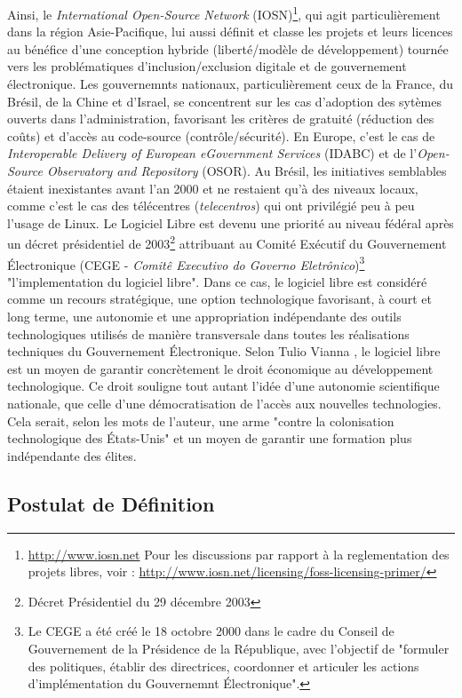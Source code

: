 Ainsi, le \emph{International Open-Source Network} (IOSN)\footnote{\url{http://www.iosn.net} Pour les discussions par rapport à la reglementation des projets libres, voir : \url{http://www.iosn.net/licensing/foss-licensing-primer/}}, qui agit particulièrement dans la région Asie-Pacifique, lui aussi définit et classe les projets et leurs licences au bénéfice d'une conception hybride (liberté/modèle de développement) tournée vers les problématiques d'inclusion/exclusion digitale et de gouvernement électronique. Les gouvernemnts nationaux, particulièrement ceux de la France, du Brésil, de la Chine et d'Israel, se concentrent sur les cas d'adoption des sytèmes ouverts dans l'administration, favorisant les critères de gratuité (réduction des coûts) et d'accès au code-source (contrôle/sécurité). En Europe, c'est le cas de \emph{Interoperable Delivery of European eGovernment Services} (IDABC) et de l'\emph{Open-Source Observatory and Repository} (OSOR). Au Brésil, les initiatives semblables étaient inexistantes avant l'an 2000 et ne restaient qu'à des niveaux locaux, comme c'est le cas des télécentres (\emph{telecentros}) qui ont privilégié peu à peu l'usage de Linux. Le Logiciel Libre est devenu une priorité au niveau fédéral après un décret présidentiel de 2003\footnote{Décret Présidentiel du 29 décembre 2003} attribuant au Comité Exécutif du Gouvernement \'Electronique (CEGE - \emph{Comitê Executivo do Governo Eletrônico})\footnote{Le CEGE a été créé le 18 octobre 2000 dans le cadre du Conseil de Gouvernement de la Présidence de la République, avec l'objectif de "formuler des politiques, établir des directrices, coordonner et articuler les actions d'implémentation du Gouvernemnt \'Electronique".} "l'implementation du logiciel libre". Dans ce cas, le logiciel libre est considéré comme un recours stratégique, une option technologique favorisant, à court et long terme, une autonomie et une appropriation indépendante des outils technologiques utilisés de manière transversale dans toutes les réalisations techniques du Gouvernement \'Electronique. Selon Tulio Vianna \citep{Vianna2006}, le logiciel libre est un moyen de garantir concrètement le droit économique au développement technologique. Ce droit souligne tout autant l'idée d'une autonomie scientifique nationale, que celle d'une démocratisation de l'accès aux nouvelles technologies. Cela serait, selon les mots de l'auteur, une arme "contre la colonisation technologique des \'Etats-Unis" et un moyen de garantir une formation plus indépendante des élites.

\subsection{Postulat de Définition} \label{1.3.4}

